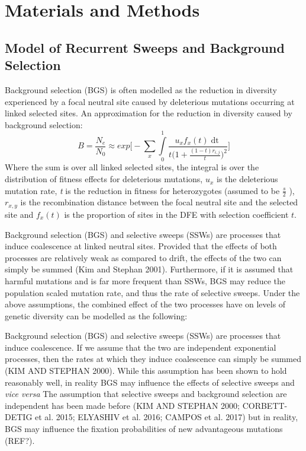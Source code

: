 \documentclass[11pt]{article}
\begin{document}
%
%
\section*{Materials and Methods}

	\subsection*{Model of Recurrent Sweeps and Background Selection}
Background selection (BGS) is often modelled as the reduction in diversity experienced by a focal neutral site caused by deleterious mutations occurring at linked selected sites. An approximation for the reduction in diversity caused by background selection:
\begin{equation}
B = \frac{N_{e}}{N_{0}} \approx exp\Bigg[- \sum \limits_{x} \int \limits_{0}^1 \frac{u_{x}f_x(t)\mathop{dt}}{t \Big( 1 + \frac{(1-t)r_{i,j}}{t} \Big)^2} \Bigg]
\end{equation}
Where the sum is over all linked selected sites, the integral is over the distribution of fitness effects for deleterious mutations, \emph{$u_{x}$} is the deleterious mutation rate, \emph{t} is the reduction in fitness for heterozygotes (assumed to be \(\frac{s}{2}\) ), $r_{x,y}$  is the recombination distance between the focal neutral site and the selected site and $f_x(t)$ is the proportion of sites in the DFE with selection coefficient $t$.

	Background selection (BGS) and selective sweeps (SSWs) are processes that induce coalescence at linked neutral sites. Provided that the effects of both processes are relatively weak as compared to drift, the effects of the two can simply be summed (Kim and Stephan 2001). Furthermore, if it is assumed that harmful mutations and is far more frequent than SSWs, BGS may reduce the population scaled mutation rate, and thus the rate of selective sweeps. Under the above assumptions, the combined effect of the two processes have on levels of genetic diversity can be modelled as the following:
	

	Background selection (BGS) and selective sweeps (SSWs) are processes that induce coalescence. If we assume that the two are independent exponential processes, then the rates at which they induce coalescence can simply be summed (KIM AND STEPHAN 2000). While this assumption has been shown to hold reasonably well, in reality BGS may influence the effects of selective sweeps and \emph{vice versa}
	The assumption that selective sweeps and background selection are independent has been made before (KIM AND STEPHAN 2000; CORBETT-DETIG et al. 2015; ELYASHIV et al. 2016; CAMPOS et al. 2017) but in reality, BGS may influence the fixation probabilities of new advantageous mutations (REF?). 
\end{document}
